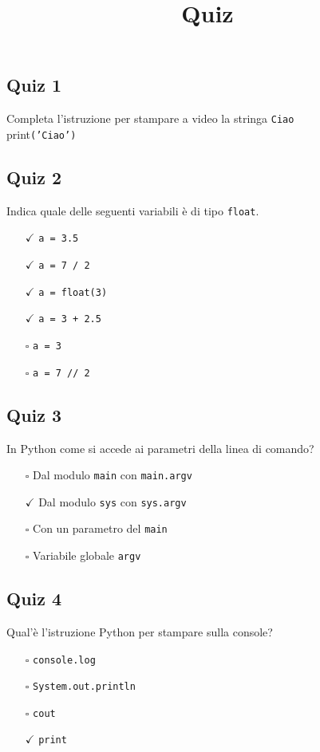 \documentclass{article}
\title{Quiz}
\begin{document}
\pagestyle{fancy}
\fancyhf{}


\subsection*{Quiz 1}
Completa l'istruzione per stampare a video la stringa \texttt{Ciao}\\
print\texttt{('Ciao')}\subsection*{Quiz 2}
Indica quale delle seguenti variabili è di tipo \texttt{float}.
\begin{itemize}
  \item[$\checkmark$] \texttt{a = 3.5}
  \item[$\checkmark$] \texttt{a = 7 / 2}
  \item[$\checkmark$] \texttt{a = float(3)}
  \item[$\checkmark$] \texttt{a = 3 + 2.5}
  \item[$\square$] \texttt{a = 3}
  \item[$\square$] \texttt{a = 7 // 2}
\end{itemize}
\subsection*{Quiz 3}
In Python come si accede ai parametri della linea di comando?
\begin{itemize}
  \item[$\square$] Dal modulo \texttt{main} con \texttt{main.argv}
  \item[$\checkmark$] Dal modulo \texttt{sys} con \texttt{sys.argv}
  \item[$\square$] Con un parametro del \texttt{main}
  \item[$\square$] Variabile globale \texttt{argv}
\end{itemize}
\subsection*{Quiz 4}
Qual'è l'istruzione Python per stampare sulla console?
\begin{itemize}
  \item[$\square$] \texttt{console.log}
  \item[$\square$] \texttt{System.out.println}
  \item[$\square$] \texttt{cout}
  \item[$\checkmark$] \texttt{print}
\end{itemize}
\end{document}
